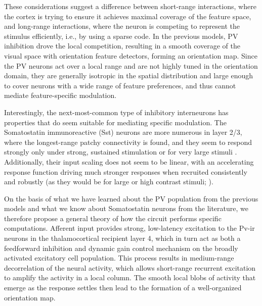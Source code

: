 These considerations suggest a difference between short-range
interactions, where the cortex is trying to ensure it achieves maximal
coverage of the feature space, and long-range interactions, where the
neuron is competing to represent the stimulus efficiently, i.e., by
using a sparse code. In the previous models, PV inhibition drove the
local competition, resulting in a smooth coverage of the visual space
with orientation feature detectors, forming an orientation map. Since
the PV neurons act over a local range and are not highly tuned in the
orientation domain, they are generally isotropic in the spatial
distribution and large enough to cover neurons with a wide range of
feature preferences, and thus cannot mediate feature-specific
modulation.

Interestingly, the next-most-common type of inhibitory interneurons
has properties that do seem suitable for mediating specific
modulation.  The Somatostatin immunoreactive (Sst) neurons
\citep{Gonchar2007,Xu2010} are more numerous in layer 2/3, where the
longest-range patchy connectivity is found, and they seem to respond
strongly only under strong, sustained stimulation \citep{Ma2011} or
for very large stimuli \citep{Adesnik2012}. Additionally, their input
scaling does not seem to be linear, with an accelerating response
function driving much stronger responses when recruited consistently
and robustly (as they would be for large or high contrast stimuli;
\citealt{Beierlein2003,Bartley2008,Tan2008}).

On the basis of what we have learned about the PV population from the
previous models and what we know about Somatostatin neurons from the
literature, we therefore propose a general theory of how the circuit
performs specific computations. Afferent input provides strong,
low-latency excitation to the Pv-ir neurons in the thalamocortical
recipient layer 4, which in turn act as both a feedforward inhibition
and dynamic gain control mechanism on the broadly activated excitatory
cell population. This process results in medium-range decorrelation of
the neural activity, which allows short-range recurrent excitation to
amplify the activity in a local column.  The smooth local blobs of
activity that emerge as the response settles then lead to the
formation of a well-organized orientation map.

